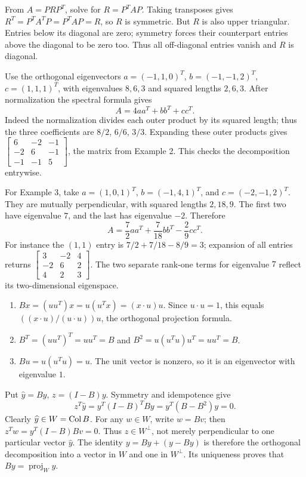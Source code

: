 From $A=PRP^T$, solve for $R=P^TAP$.
Taking transposes gives $R^T=P^TA^TP=P^TAP=R$, so $R$ is symmetric.
But $R$ is also upper triangular. Entries below its diagonal are zero;
symmetry forces their counterpart entries above the diagonal to be zero too.
Thus all off-diagonal entries vanish and $R$ is diagonal.

Use the orthogonal eigenvectors
$a=(-1,1,0)^T$, $b=(-1,-1,2)^T$, $c=(1,1,1)^T$,
with eigenvalues $8,6,3$ and squared lengths $2,6,3$.
After normalization the spectral formula gives
\[
 \boxed{A=4aa^T+bb^T+cc^T}.
\]
Indeed the normalization divides each outer product by its squared length;
thus the three coefficients are $8/2$, $6/6$, $3/3$.
Expanding these outer products gives
$\begin{bmatrix}6&-2&-1\\-2&6&-1\\-1&-1&5\end{bmatrix}$,
the matrix from Example 2. This checks the decomposition entrywise.

For Example 3, take $a=(1,0,1)^T$, $b=(-1,4,1)^T$, and
$c=(-2,-1,2)^T$. They are mutually perpendicular, with squared lengths
$2,18,9$. The first two have eigenvalue $7$, and the last has eigenvalue
$-2$. Therefore
\[
 \boxed{A=\frac72aa^T+\frac7{18}bb^T-\frac29cc^T}.
\]
For instance the $(1,1)$ entry is $7/2+7/18-8/9=3$;
expansion of all entries returns
$\begin{bmatrix}3&-2&4\\-2&6&2\\4&2&3\end{bmatrix}$.
The two separate rank-one terms for eigenvalue $7$ reflect its
two-dimensional eigenspace.

\begin{enumerate}[label=(\alph*)]
\item $Bx=(uu^T)x=u(u^Tx)=(x\cdot u)u$.
Since $u\cdot u=1$, this equals
$((x\cdot u)/(u\cdot u))u$, the orthogonal projection formula.
\item $B^T=(uu^T)^T=uu^T=B$ and
$B^2=u(u^Tu)u^T=uu^T=B$.
\item $Bu=u(u^Tu)=u$. The unit vector is nonzero, so it is an
eigenvector with eigenvalue $1$.
\end{enumerate}

Put $\widehat y=By$, $z=(I-B)y$. Symmetry and idempotence give
\[
 z^T\widehat y=y^T(I-B)^TBy=y^T(B-B^2)y=0.
\]
Clearly $\widehat y\in W=\operatorname{Col} B$. For any $w\in W$, write $w=Bv$;
then $z^Tw=y^T(I-B)Bv=0$. Thus $z\in W^\perp$, not merely
perpendicular to one particular vector $\widehat y$.
The identity $y=By+(y-By)$ is therefore the orthogonal decomposition
into a vector in $W$ and one in $W^\perp$. Its uniqueness proves that
$By=\operatorname{proj}_W y$.

